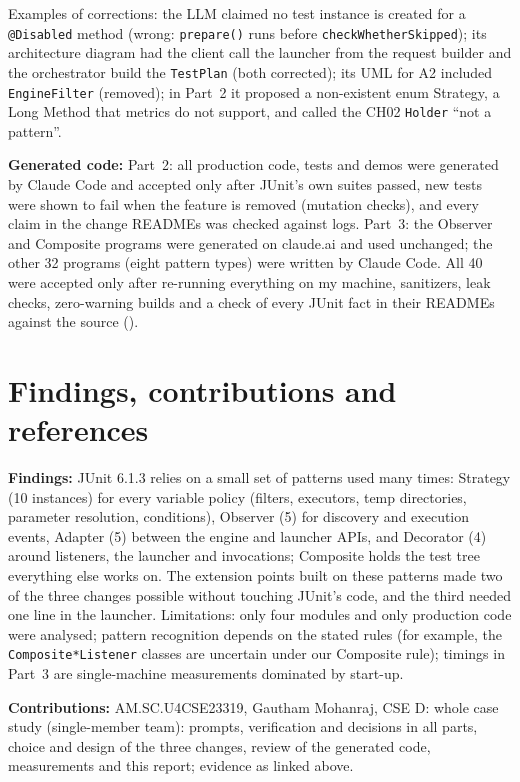 \documentclass[11pt,a4paper]{article}
\newcommand{\entry}[1]{\textbf{#1:} }
\begin{document}
Examples of corrections: the LLM claimed no test instance is created for a \texttt{@Disabled} method (wrong: \texttt{prepare()} runs before \texttt{checkWhetherSkipped}); its architecture diagram had the client call the launcher from the request builder and the orchestrator build the \texttt{TestPlan} (both corrected); its UML for A2 included \texttt{EngineFilter} (removed); in Part~2 it proposed a non-existent enum Strategy, a Long Method that metrics do not support, and called the CH02 \texttt{Holder} ``not a pattern''.

\entry{Generated code}Part~2: all production code, tests and demos were generated by Claude Code and accepted only after JUnit's own suites passed, new tests were shown to fail when the feature is removed (mutation checks), and every claim in the change READMEs was checked against logs. Part~3: the Observer and Composite programs were generated on claude.ai and used unchanged; the other 32 programs (eight pattern types) were written by Claude Code. All 40 were accepted only after re-running everything on my machine, sanitizers, leak checks, zero-warning builds and a check of every JUnit fact in their READMEs against the source ().

\section{Findings, contributions and references}
\entry{Findings}JUnit 6.1.3 relies on a small set of patterns used many times: Strategy (10 instances) for every variable policy (filters, executors, temp directories, parameter resolution, conditions), Observer (5) for discovery and execution events, Adapter (5) between the engine and launcher APIs, and Decorator (4) around listeners, the launcher and invocations; Composite holds the test tree everything else works on. The extension points built on these patterns made two of the three changes possible without touching JUnit's code, and the third needed one line in the launcher. Limitations: only four modules and only production code were analysed; pattern recognition depends on the stated rules (for example, the \texttt{Composite*Listener} classes are uncertain under our Composite rule); timings in Part~3 are single-machine measurements dominated by start-up.

\entry{Contributions}AM.SC.U4CSE23319, Gautham Mohanraj, CSE D: whole case study (single-member team): prompts, verification and decisions in all parts, choice and design of the three changes, review of the generated code, measurements and this report; evidence as linked above.
\end{document}
